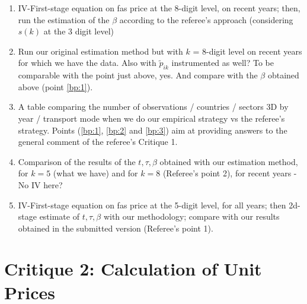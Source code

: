 \documentclass[a4paper,12pt]{article}
\begin{document}
\begin{enumerate}
\item\label{bp:1} IV-First-stage equation on fas price at the 8-digit level, on recent years; then, run the estimation of the $\beta$ according to the referee's approach (considering $s(k)$ at the 3 digit level)
\item\label{bp:2} Run our original estimation method but with $k$ = 8-digit level on recent years for which we have the data. Also with $\widetilde{p}_{ik}$ instrumented as well? To be comparable with the point just above, yes. And compare with the $\beta$ obtained above (point \ref{bp:1}).
\item\label{bp:3} A table comparing the number of observations / countries / sectors 3D by year / transport mode when we do our empirical strategy vs the referee's strategy. Points (\ref{bp:1}, \ref{bp:2} and \ref{bp:3}) aim at providing answers to the general comment of the referee's Critique 1.
\item\label{bp:4} Comparison of the results of the $t,\tau,\beta$ obtained with our estimation method, for $k=5$ (what we have) and for $k=8$ (Referee's point 2), for recent years - No IV here?
\item\label{bp:5}IV-First-stage equation on fas price at the 5-digit level, for all years; then 2d-stage estimate of $t,\tau, \beta$ with our methodology; compare with our results obtained in the submitted version (Referee's point 1).
\end{enumerate}

\section{Critique 2: Calculation of Unit Prices}
\end{document}
